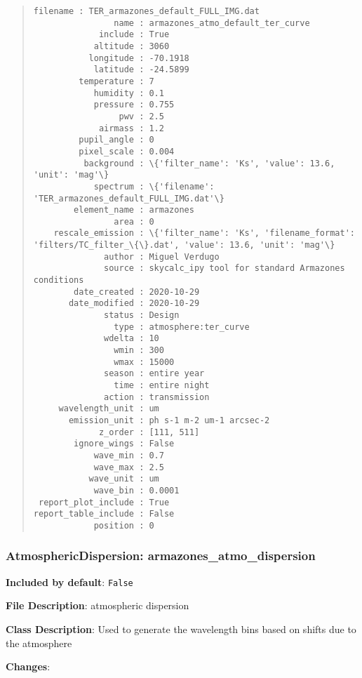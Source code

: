 \begin{quote}
\begin{alltt}
\begin{lstlisting}[frame=single]
            filename : TER_armazones_default_FULL_IMG.dat
                name : armazones_atmo_default_ter_curve
             include : True
            altitude : 3060
           longitude : -70.1918
            latitude : -24.5899
         temperature : 7
            humidity : 0.1
            pressure : 0.755
                 pwv : 2.5
             airmass : 1.2
         pupil_angle : 0
         pixel_scale : 0.004
          background : \{'filter_name': 'Ks', 'value': 13.6, 'unit': 'mag'\}
            spectrum : \{'filename': 'TER_armazones_default_FULL_IMG.dat'\}
        element_name : armazones
                area : 0
    rescale_emission : \{'filter_name': 'Ks', 'filename_format': 'filters/TC_filter_\{\}.dat', 'value': 13.6, 'unit': 'mag'\}
              author : Miguel Verdugo
              source : skycalc_ipy tool for standard Armazones conditions
        date_created : 2020-10-29
       date_modified : 2020-10-29
              status : Design
                type : atmosphere:ter_curve
              wdelta : 10
                wmin : 300
                wmax : 15000
              season : entire year
                time : entire night
              action : transmission
     wavelength_unit : um
       emission_unit : ph s-1 m-2 um-1 arcsec-2
             z_order : [111, 511]
        ignore_wings : False
            wave_min : 0.7
            wave_max : 2.5
           wave_unit : um
            wave_bin : 0.0001
 report_plot_include : True
report_table_include : False
            position : 0
\end{lstlisting}
\end{alltt}
\end{quote}


\subsubsection{AtmosphericDispersion: \textquotedbl{}armazones\_atmo\_dispersion\textquotedbl{}%
  \label{atmosphericdispersion-armazones-atmo-dispersion}%
}

\textbf{Included by default}: \texttt{False}

\textbf{File Description}: atmospheric dispersion

\textbf{Class Description}: Used to generate the wavelength bins based on shifts due to the atmosphere

\textbf{Changes}:

